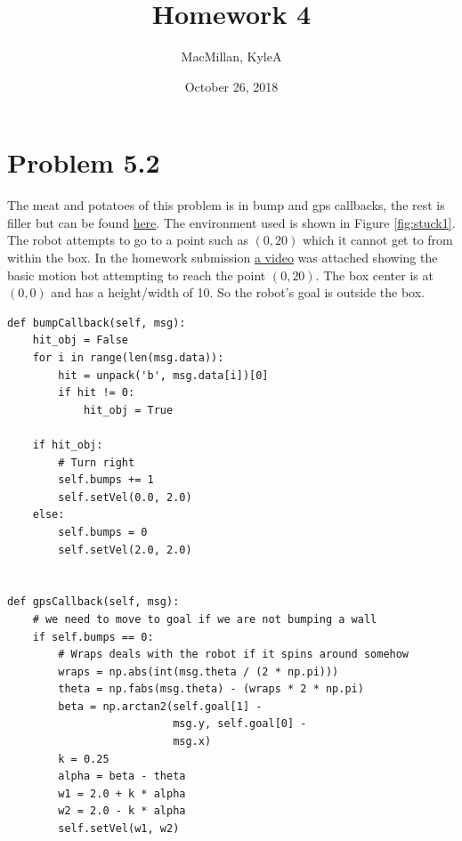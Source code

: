 \documentclass{article}
\title{\textbf{Homework 4}}
\author{MacMillan, KyleA}
\date{October 26, 2018}
\begin{document}
\maketitle

\newpage
\tableofcontents
{}
\newpage
\listoffigures
{}



\newpage
\hypersetup{
    colorlinks,
    citecolor=blue,
    filecolor=black,
    linkcolor=blue,
    urlcolor=blue
}

\setcounter{page}{1}
\newpage
\section{\textbf{Problem 5.2}}
The meat and potatoes of this problem is in bump and gps callbacks, the 
rest is filler but can be found \href{https://github.com/macattackftw/RoboticsHW/blob/master/HW4/Problem2.py}{here}. 
The environment used is shown in Figure \ref{fig:stuck1}. The robot attempts to 
go to a point such as $(0, 20)$ which it cannot get to from within the box. In 
the homework submission \href{}{a video} was attached showing the basic motion bot 
attempting to reach the point $(0, 20)$. The box center is at $(0, 0)$ and has a 
height/width of 10. So the robot's goal is outside the box.

\begin{verbatim}
def bumpCallback(self, msg):
    hit_obj = False
    for i in range(len(msg.data)):
        hit = unpack('b', msg.data[i])[0]
        if hit != 0:
            hit_obj = True

    if hit_obj:
        # Turn right
        self.bumps += 1
        self.setVel(0.0, 2.0)
    else:
        self.bumps = 0
        self.setVel(2.0, 2.0)


def gpsCallback(self, msg):
    # we need to move to goal if we are not bumping a wall
    if self.bumps == 0:
        # Wraps deals with the robot if it spins around somehow
        wraps = np.abs(int(msg.theta / (2 * np.pi)))
        theta = np.fabs(msg.theta) - (wraps * 2 * np.pi)
        beta = np.arctan2(self.goal[1] -
                          msg.y, self.goal[0] -
                          msg.x)
        k = 0.25
        alpha = beta - theta
        w1 = 2.0 + k * alpha
        w2 = 2.0 - k * alpha
        self.setVel(w1, w2)

\end{verbatim}
\end{document}
